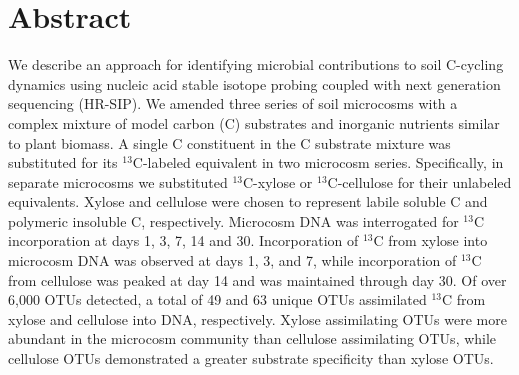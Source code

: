 \section{Abstract}
We describe an approach for identifying microbial contributions
to soil C-cycling dynamics using nucleic acid stable isotope probing coupled
with next generation sequencing (HR-SIP). We amended three series of soil microcosms
with a complex mixture of model carbon (C) substrates and inorganic nutrients
similar to plant biomass. A single C constituent in the C substrate mixture was
substituted for its $^{13}$C-labeled equivalent in two microcosm series.
Specifically, in separate microcosms we substituted $^{13}$C-xylose or
$^{13}$C-cellulose for their unlabeled equivalents. Xylose and cellulose were
chosen to represent labile soluble C and polymeric insoluble C, respectively.
Microcosm DNA was interrogated for $^{13}$C incorporation at days 1, 3, 7, 14 and 
30. Incorporation of $^{13}$C from xylose into microcosm DNA
was observed at days 1, 3, and 7, while incorporation of $^{13}$C from
cellulose was peaked at day 14 and was maintained through day 30. Of over 6,000
OTUs detected, a total of 49 and 63 unique OTUs assimilated $^{13}$C from
xylose and cellulose into DNA, respectively. Xylose assimilating OTUs were more
abundant in the microcosm community than cellulose assimilating OTUs, while
cellulose OTUs demonstrated a greater substrate specificity than xylose OTUs.
